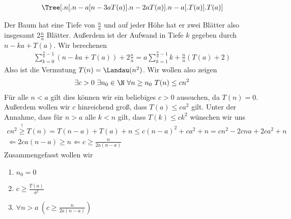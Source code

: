 \begin{solution}

	\begin{align*}
	\Tree [.n [.n-a [ n-3a T(a) ].n-2a T(a) ].n-a [.T(a) ].T(a) ]
	\end{align*}
	
	Der Baum hat eine Tiefe von $\frac{n}{a}$ und auf jeder Höhe hat er zwei Blätter also insgesamt $2\frac{n}{a}$ Blätter. Außerdem ist der Aufwand in Tiefe $k$ gegeben durch $n - ka + T(a)$. Wir berechenen
	\begin{align*}
	\sum_{k=0}^{\frac{n}{a} - 1} (n - ka + T(a)) + 2 \frac{n}{a} = a \sum_{k = 1}^{\frac{n}{a} - 1} k + \frac{n}{a} (T(a) + 2) 
	\end{align*}
	Also ist die Vermutung $T(n) = \Landau(n^2)$. Wir wollen also zeigen
	\begin{align*}
	\exists c >0 \ \exists n_0 \in \N \ \forall n \geq n_0 \ T(n) \leq c n^2
	\end{align*}
	Für alle $n < a$ gilt dies können wir ein beliebiges $c > 0$ aussuchen, da $T(n) = 0$. Außerdem wollen wir $c$ hinreichend groß, dass $T(a) \leq c a^2$ gilt. Unter der Annahme, dass für $n > a$ alle $k < n$ gilt, dass $T(k) \leq c k^2$ wünschen wir uns
	\begin{align*}
	c n^2 \stackrel{!}{\geq} T(n) = T(n - a) + T(a) + n \leq c(n - a)^2 + ca^2 + n = cn^2 - 2cna + 2ca^2 + n \\ 
	\Leftarrow 2ca(n - a) \geq n \Leftarrow c \geq \frac{n}{2a(n - a)}
	\end{align*}
	Zusammengefasst wollen wir
	\begin{enumerate}
		\item $n_0 = 0$
		\item $c \geq \frac{T(a)}{a^2}$
		\item $\forall n > a \ (c \geq \frac{n}{2a(n - a)})$
	\end{enumerate}
\end{solution}

